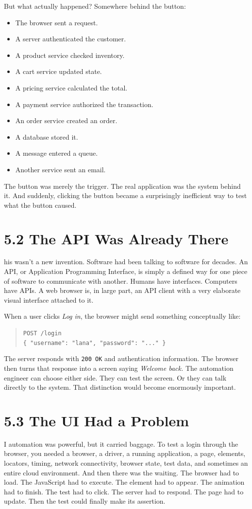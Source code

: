 \documentclass[11pt, a4paper, openany]{book}
\newcommand{\initialcap}[1]{{\fontfamily{lmss}\selectfont\huge\textbf{#1}}}
\begin{document}
\noindent But what actually happened? Somewhere behind the button:
\begin{itemize}
    \item The browser sent a request.
    \item A server authenticated the customer.
    \item A product service checked inventory.
    \item A cart service updated state.
    \item A pricing service calculated the total.
    \item A payment service authorized the transaction.
    \item An order service created an order.
    \item A database stored it.
    \item A message entered a queue.
    \item Another service sent an email.
\end{itemize}
The button was merely the trigger. The real application was the system behind it. And suddenly, clicking the button became a surprisingly inefficient way to test what the button caused.

\section{5.2 The API Was Already There}
\noindent \initialcap{T}his wasn't a new invention. Software had been talking to software for decades. An API, or Application Programming Interface, is simply a defined way for one piece of software to communicate with another. Humans have interfaces. Computers have APIs. A web browser is, in large part, an API client with a very elaborate visual interface attached to it. 

When a user clicks \textit{Log in}, the browser might send something conceptually like:
\begin{quote}
\texttt{POST /login} \\
\texttt{\{\ "username": "lana", "password": "..." \}}
\end{quote}
The server responds with \texttt{200 OK} and authentication information. The browser then turns that response into a screen saying \textit{Welcome back.} The automation engineer can choose either side. They can test the screen. Or they can talk directly to the system. That distinction would become enormously important.

\section{5.3 The UI Had a Problem}
\noindent \initialcap{U}I automation was powerful, but it carried baggage. To test a login through the browser, you needed a browser, a driver, a running application, a page, elements, locators, timing, network connectivity, browser state, test data, and sometimes an entire cloud environment. And then there was the waiting. The browser had to load. The JavaScript had to execute. The element had to appear. The animation had to finish. The test had to click. The server had to respond. The page had to update. Then the test could finally make its assertion.
\end{document}
